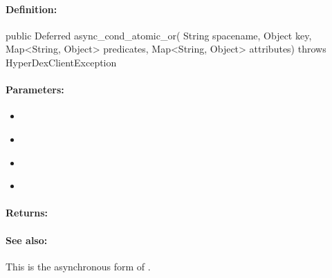 \paragraph{Definition:}
\begin{javacode}
public Deferred async_cond_atomic_or(
        String spacename,
        Object key,
        Map<String, Object> predicates,
        Map<String, Object> attributes) throws HyperDexClientException
\end{javacode}

\paragraph{Parameters:}
\begin{itemize}[noitemsep]
\item {}\\

\item {}\\

\item {}\\

\item {}\\

\end{itemize}

\paragraph{Returns:}


\paragraph{See also:}  This is the asynchronous form of .

\pagebreak
\subsubsection{}
\label{api:java:group_atomic_xor}


